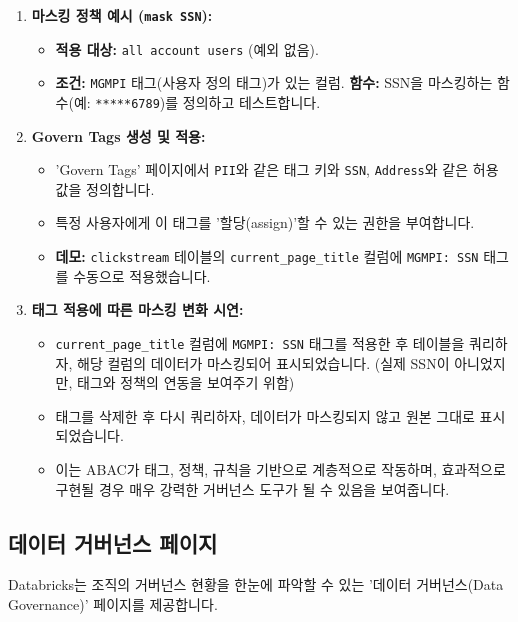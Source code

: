 \documentclass[11pt,a4paper]{article}
\theoremstyle{definition}
\begin{document}
\begin{enumerate}
\begin{itemize}
    \end{itemize}
    \item \textbf{마스킹 정책 예시 (\texttt{mask SSN}):}
    \begin{itemize}
        \item \textbf{적용 대상:} \texttt{all account users} (예외 없음).
        \item \textbf{조건:} \texttt{MGMPI} 태그(사용자 정의 태그)가 있는 컬럼.
        \textbf{함수:} SSN을 마스킹하는 함수(예: \texttt{*****6789})를 정의하고 테스트합니다.
    \end{itemize}
    \item \textbf{Govern Tags 생성 및 적용:}
    \begin{itemize}
        \item 'Govern Tags' 페이지에서 \texttt{PII}와 같은 태그 키와 \texttt{SSN}, \texttt{Address}와 같은 허용 값을 정의합니다.
        \item 특정 사용자에게 이 태그를 '할당(assign)'할 수 있는 권한을 부여합니다.
        \item \textbf{데모:} \texttt{clickstream} 테이블의 \texttt{current\_page\_title} 컬럼에 \texttt{MGMPI: SSN} 태그를 수동으로 적용했습니다.
    \end{itemize}
    \item \textbf{태그 적용에 따른 마스킹 변화 시연:}
    \begin{itemize}
        \item \texttt{current\_page\_title} 컬럼에 \texttt{MGMPI: SSN} 태그를 적용한 후 테이블을 쿼리하자, 해당 컬럼의 데이터가 마스킹되어 표시되었습니다. (실제 SSN이 아니었지만, 태그와 정책의 연동을 보여주기 위함)
        \item 태그를 삭제한 후 다시 쿼리하자, 데이터가 마스킹되지 않고 원본 그대로 표시되었습니다.
        \item 이는 ABAC가 태그, 정책, 규칙을 기반으로 계층적으로 작동하며, 효과적으로 구현될 경우 매우 강력한 거버넌스 도구가 될 수 있음을 보여줍니다.
    \end{itemize}
\end{enumerate}

\subsection*{데이터 거버넌스 페이지}

Databricks는 조직의 거버넌스 현황을 한눈에 파악할 수 있는 '데이터 거버넌스(Data Governance)' 페이지를 제공합니다.
\end{document}
